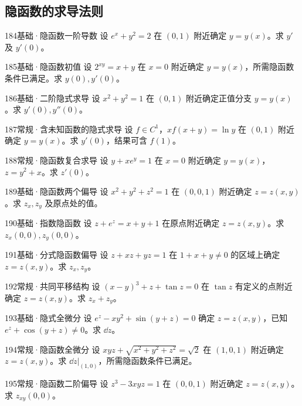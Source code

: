 \subsection{隐函数的求导法则}
\begin{exercise}{184}{基础·隐函数一阶导数}
设 $e^x+y^2=2$ 在 $(0,1)$ 附近确定 $y=y(x)$。求 $y'$ 及 $y'(0)$。
\end{exercise}
\begin{exercise}{185}{基础·隐函数初值}
设 $2^{xy}=x+y$ 在 $x=0$ 附近确定 $y=y(x)$，所需隐函数条件已满足。求 $y(0),y'(0)$。
\end{exercise}
\begin{exercise}{186}{基础·二阶隐式求导}
设 $x^2+y^2=1$ 在 $(0,1)$ 附近确定正值分支 $y=y(x)$。求 $y'(0),y''(0)$。
\end{exercise}
\begin{exercise}{187}{常规·含未知函数的隐式求导}
设 $f\in C^1$，$xf(x+y)=\ln y$ 在 $(0,1)$ 附近确定 $y=y(x)$。求 $y'(0)$，结果可含 $f(1)$。
\end{exercise}
\begin{exercise}{188}{常规·隐函数复合求导}
设 $y+xe^y=1$ 在 $x=0$ 附近确定 $y=y(x)$，$z=y^2+x$。求 $z'(0)$。
\end{exercise}
\begin{exercise}{189}{基础·隐函数两个偏导}
设 $x^2+y^2+z^2=1$ 在 $(0,0,1)$ 附近确定 $z=z(x,y)$。求 $z_x,z_y$ 及原点处的值。
\end{exercise}
\begin{exercise}{190}{基础·指数隐函数}
设 $z+e^z=x+y+1$ 在原点附近确定 $z=z(x,y)$。求 $z_x(0,0),z_y(0,0)$。
\end{exercise}
\begin{exercise}{191}{基础·分式隐函数偏导}
设 $z+xz+yz=1$ 在 $1+x+y\ne0$ 的区域上确定 $z=z(x,y)$。求 $z_x,z_y$。
\end{exercise}
\begin{exercise}{192}{常规·共同平移结构}
设 $(x-y)^3+z+\tan z=0$ 在 $\tan z$ 有定义的点附近确定 $z=z(x,y)$。求 $z_x+z_y$。
\end{exercise}
\begin{exercise}{193}{基础·隐式全微分}
设 $e^z-xy^2+\sin(y+z)=0$ 确定 $z=z(x,y)$，已知 $e^z+\cos(y+z)\ne0$。求 $\dd z$。
\end{exercise}
\begin{exercise}{194}{常规·隐函数全微分}
设 $xyz+\sqrt{x^2+y^2+z^2}=\sqrt2$ 在 $(1,0,1)$ 附近确定 $z=z(x,y)$。求 $\dd z|_{(1,0)}$，所需隐函数条件已满足。
\end{exercise}
\begin{exercise}{195}{常规·隐函数二阶偏导}
设 $z^3-3xyz=1$ 在 $(0,0,1)$ 附近确定 $z=z(x,y)$。求 $z_{xy}(0,0)$。
\end{exercise}
